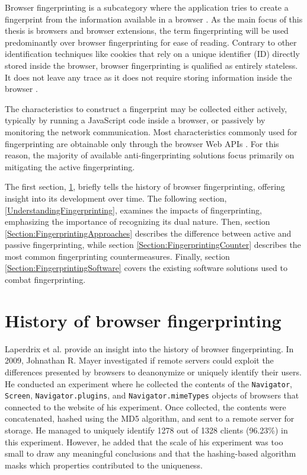 Browser fingerprinting is a subcategory where the application tries to create a fingerprint from the information available in a browser \cite{FingerprintingSurvey}.  As the main focus of this thesis is browsers and browser extensions, the term fingerprinting will be used predominantly over browser fingerprinting for ease of reading. Contrary to other identification techniques like cookies that rely on a unique identifier (ID) directly stored inside the browser, browser fingerprinting is qualified as entirely stateless. It does not leave any trace as it does not require storing information inside the browser \cite{FingerprintingSurvey}.

The characteristics to construct a fingerprint may be collected either actively, typically by running a JavaScript code inside a browser, or passively by monitoring the network communication. Most characteristics commonly used for fingerprinting are obtainable only through the browser Web APIs \cite{VondracekDP}. For this reason, the majority of available anti-fingerprinting solutions focus primarily on mitigating the active fingerprinting.

The first section, \ref{Section:FingerprintingHistory}, briefly tells the history of browser fingerprinting, offering insight into its development over time. The following section, \ref{UnderstandingFingerprinting}, examines the impacts of fingerprinting, emphasizing the importance of recognizing its dual nature. Then, section \ref{Section:FingerprintingApproaches} describes the difference between active and passive fingerprinting, while section \ref{Section:FingerprintingCounter} describes the most common fingerprinting countermeasures. Finally, section \ref{Section:FingerprintingSoftware} covers the existing software solutions used to combat fingerprinting.

\section{History of browser fingerprinting}
\label{Section:FingerprintingHistory}

Laperdrix et al. \cite{FingerprintingSurvey} provide an insight into the history of browser fingerprinting. In 2009, Johnathan R. Mayer investigated \cite{MayerAnyPerson} if remote servers could exploit the differences presented by browsers to deanonymize or uniquely identify their users. He conducted an experiment where he collected the contents of the \texttt{Navigator}, \texttt{Screen}, \texttt{Navigator.plugins}, and \texttt{Navigator.mimeTypes} objects of browsers that connected to the website of his experiment. Once collected, the contents were concatenated, hashed using the MD5 algorithm, and sent to a remote server for storage. He managed to uniquely identify 1278 out of 1328 clients (96.23\%) in this experiment. However, he added that the scale of his experiment was too small to draw any meaningful conclusions and that the hashing-based algorithm masks which properties contributed to the uniqueness.

